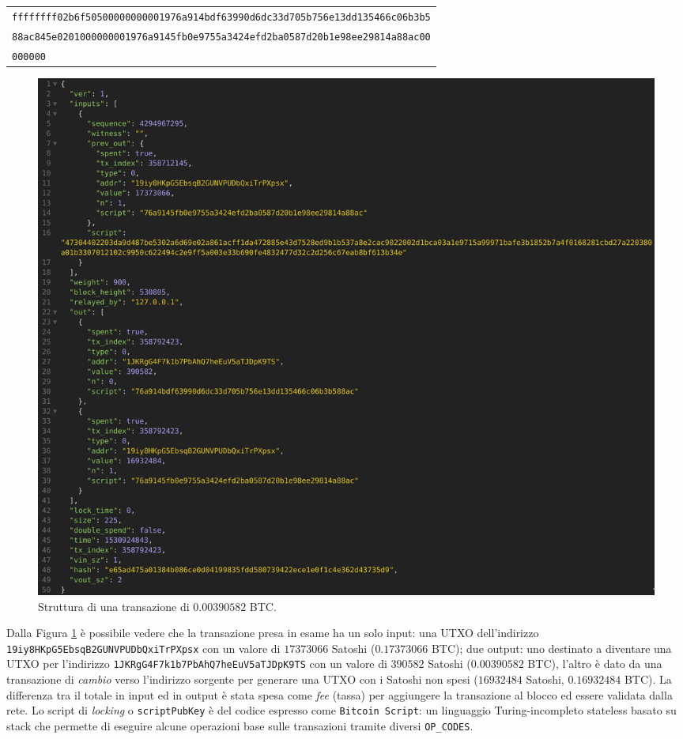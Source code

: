 \begin{enumerate}[1.]
\begin{table}[H]
\begin{tabular}{l}
        \texttt{ffffffff02b6f50500000000001976a914bdf63990d6dc33d705b756e13dd135466c06b3b5}\\
        \texttt{88ac845e0201000000001976a9145fb0e9755a3424efd2ba0587d20b1e98ee29814a88ac00}\\
        \texttt{000000}
    \end{tabular}
\end{table}
\begin{figure}[H]
    \centering
    \includegraphics[width=\textwidth]{./images/tx.png}
    \caption{Struttura di una transazione di $0.00390582$ BTC.}
    \label{fig:tx}
\end{figure}
Dalla Figura \ref{fig:tx} è possibile vedere che la transazione presa in esame ha un solo input: una UTXO dell'indirizzo \texttt{19iy8HKpG5EbsqB2GUNVPUDbQxiTrPXpsx} con un valore di $17373066$ Satoshi ($0.17373066$ BTC); due output: uno destinato a diventare una UTXO per l'indirizzo \texttt{1JKRgG4F7k1b7PbAhQ7heEuV5aTJDpK9TS} con un valore di $390582$ Satoshi ($0.00390582$ BTC), l'altro è dato da una transazione di \textit{cambio} verso l'indirizzo sorgente per generare una UTXO con i Satoshi non spesi ($16932484$ Satoshi, $0.16932484$ BTC).
La differenza tra il totale in input ed in output è stata spesa come \textit{fee} (tassa) per aggiungere la transazione al blocco ed essere validata dalla rete.\newline
Lo script di \textit{locking} o \texttt{scriptPubKey} è del codice espresso come \texttt{Bitcoin~Script}: un linguaggio Turing-incompleto stateless basato su stack che permette di eseguire alcune operazioni base sulle transazioni tramite diversi \texttt{OP\_CODES}.\newline

\end{enumerate}
